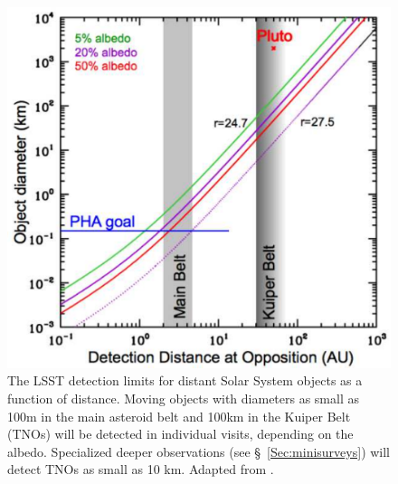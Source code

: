 \begin{figure}
\includegraphics[width=1.0\hsize,clip]{Af9.pdf}
\caption{The LSST detection limits for distant Solar System objects as
  a function of distance.
Moving objects with diameters as small as 100m in the main asteroid belt and
100km in the Kuiper Belt (TNOs) will be detected in individual visits,
depending on the albedo. Specialized deeper observations
(see \S~\ref{Sec:minisurveys}) will detect TNOs as small as 10 km. Adapted from
\cite{Jones2007}.}
\label{Fig:Af9}
\end{figure}



